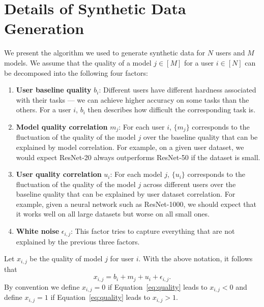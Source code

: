 \documentclass[letterpaper]{vldb}
\begin{document}
\section{Details of Synthetic Data Generation}\label{sec:appendix:synthetic}

We present the algorithm we used to generate synthetic data for $N$ users and $M$ models.
We assume that the quality of a model $j\in[M]$ for a user $i\in[N]$ can be decomposed into the following four factors:

\vspace{-0.5em}
\begin{enumerate}
\item {\bf User baseline quality} $b_i$: Different users have different
      hardness associated with their tasks --- we can achieve higher accuracy on some tasks than the others.
      For a user $i$, $b_i$ then describes how difficult the corresponding task is.
\vspace{-0.5em}
\item {\bf Model quality correlation} $m_j$: For each user $i$, $\{m_j\}$ corresponds to the fluctuation of the quality of the model $j$ over the baseline quality that can be explained by model correlation.
      For example, on a given user dataset, we would expect ResNet-20 always outperforms ResNet-50 if the dataset is small.
\vspace{-0.5em}
\item {\bf User quality correlation} $u_i$: For each model $j$, $\{u_i\}$ corresponds to the fluctuation of the quality of the model $j$ across different users
      over the baseline quality that can be explained by user dataset correlation.
      For example, given a neural network such as ResNet-1000, we should expect that it works well on all large datasets but worse on all small ones.
\vspace{-0.5em}
\item {\bf White noise} $\epsilon_{i,j}$: This factor tries to capture everything that are
      not explained by the previous three factors.
\end{enumerate}
\vspace{-0.5em}

Let $x_{i,j}$ be the quality of model $j$ for user $i$. With the above notation, it follows that
\begin{equation}\label{eq:quality}
x_{i,j} = b_i + m_j + u_i + \epsilon_{i,j}.
\end{equation}
By convention we define $x_{i,j}=0$ if Equation~\ref{eq:quality} leads to $x_{i,j}<0$ and define $x_{i,j}=1$ if Equation~\ref{eq:quality} leads to $x_{i,j}>1$.
\end{document}
